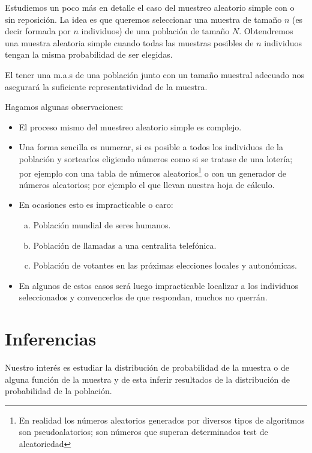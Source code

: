 \documentclass[12pt]{report}
\begin{document}
Estudiemos un poco más en detalle el caso del muestreo aleatorio simple con o sin reposición.
La idea es que queremos seleccionar una muestra de tamaño $n$ (es decir formada por $n$ individuos) 
de una población de tamaño $N$.
Obtendremos una muestra aleatoria simple  cuando todas las muestras posibles de $n$ individuos tengan la misma probabilidad de ser elegidas.

El tener una m.a.s de una población junto con un tamaño muestral adecuado nos asegurará la suficiente representatividad  de la muestra.

Hagamos algunas observaciones:

\begin{itemize}
      \item El proceso mismo del muestreo aleatorio simple es complejo.
      \item Una forma sencilla es numerar, si es posible a todos los
      individuos de la población y sortearlos eligiendo números como si se
      tratase de una lotería; por ejemplo con una tabla de números
      aleatorios\footnote{En realidad los números aleatorios generados por
      diversos tipos de algoritmos  son pseudoalatorios; son números que superan determinados
      test de aleatoriedad} o con un generador de números aleatorios; por ejemplo el que llevan nuestra hoja de cálculo.
      \item En ocasiones esto es impracticable o caro:
      \begin{enumerate}[a)]
          \item Población mundial de seres humanos.
          \item Población de llamadas a una centralita telefónica.
          \item Población de votantes en las próximas elecciones locales
          y autonómicas.
			\end{enumerate}

      \item En algunos de estos casos será luego impracticable localizar a
      los individuos seleccionados y convencerlos de que respondan, muchos no querrán.
\end{itemize}

\section{Inferencias}

       Nuestro interés es estudiar la distribución de probabilidad de la
       muestra o de alguna función de la muestra y de esta inferir
       resultados  de la distribución de probabilidad de la población.
\end{document}
